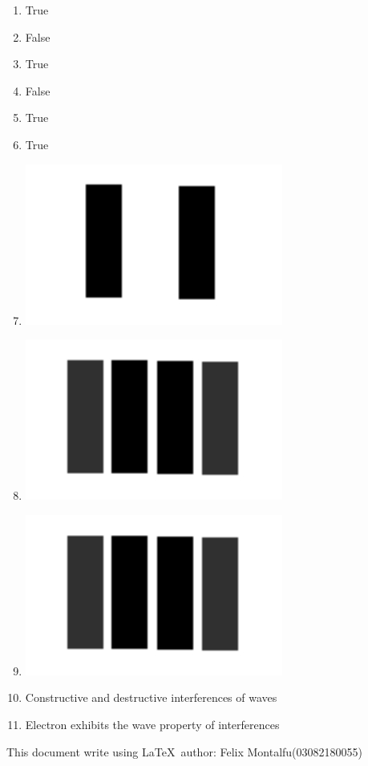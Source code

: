\documentclass[a4paper]{article}
\begin{document}
    \begin{enumerate}[1.]
        \item True
        \item False
        \item True
        \item False
        \item True
        \item True
        \item \includegraphics{1.jpeg}
        \item \includegraphics{2.jpeg}
        \item \includegraphics{2.jpeg}
        \item Constructive and destructive interferences of waves
        \item Electron exhibits the wave property of interferences
    \end{enumerate}
    This document write using \LaTeX \ author: Felix Montalfu(03082180055) 
\end{document}
